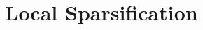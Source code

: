 \documentclass{patmorin}
\begin{document}


%
%

\section{Local Sparsification}
\label{local_sparsification_section}
\end{document}
